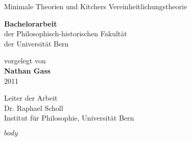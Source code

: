 \documentclass[titlepage]{article}
\begin{document}
\begin{titlepage}

{\huge \bf \begin{onehalfspace}
Minimale Theorien und Kitchers Vereinheitlichungstheorie
\end{onehalfspace} }

\vspace{3cm}
\vfill

{\bf \large Bachelorarbeit\\}
der Philosophisch-historischen Fakultät\\
der Universität Bern

\vspace{2cm}
\vfill

vorgelegt von\\
{\bf Nathan Gass\\}
2011

\vfill

Leiter der Arbeit\\
Dr. Raphael Scholl\\
Institut für Philosophie, Universität Bern

\end{titlepage}

\tableofcontents

\pagebreak

$body$

\renewcommand\refname{$biblio-title$}

\end{document}
